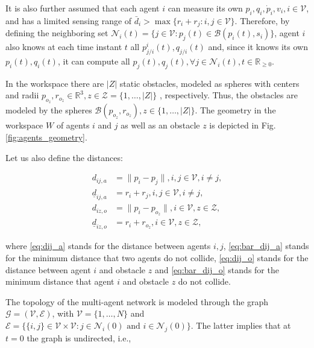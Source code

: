 It is also further assumed that each agent $i$ can measure its
own $p_i,q_i, \dot{p}_i, v_i, i\in\mathcal{V}$, and has a limited sensing range
of $\bar{d}_i > \max\{r_i+r_j: i,j \in \mathcal{V}\}$. Therefore, by defining
the neighboring set $\mathcal{N}_i(t) = \{j\in\mathcal{V} : p_j(t)\in\mathcal{B}(p_i(t), s_i)\}$,
agent $i$ also knows at each time instant $t$ all $p^i_{j/i}(t), q_{j/i}(t)$
and, since it knows its own $p_i(t),q_i(t)$, it can compute all
$p_{j}(t), q_{j}(t), \forall j\in \mathcal{N}_i(t),t\in\mathbb{R}_{\geq 0}$.

In the workspace there are $|Z|$ static obstacles, modeled as spheres with
centers and radii $p_{o_z}, r_{o_z}\in \mathbb{R}^3, z \in \mathcal{Z} = \{1,\dots,|Z| \}$
, respectively. Thus, the obstacles are modeled by the spheres
$\mathcal{B}(p_{o_z}, r_{o_z}), z \in \{1,\dots,|Z|\}$. The geometry in the
workspace $W$ of agents $i$ and $j$ as well as an obstacle $z$ is depicted in
Fig. \ref{fig:agents_geometry}.

Let us also define the distances:

\begin{subequations}
	\begin{align}
	d_{ij,a} &= \| p_i - p_j \|, i,j \in \mathcal{V}, i \neq j, \label{eq:dij_a}\\
	\underline{d}_{ij, a} &= r_{i} + r_{j}, i,j \in \mathcal{V}, i \neq j, \label{eq:bar_dij_a} \\
	d_{iz,o} &= \| p_i - p_{o_z} \|, i \in \mathcal{V}, z \in \mathcal{Z}, \label{eq:dij_o} \\
	\underline{d}_{iz, o} &= r_{i} + r_{o_z}, i \in \mathcal{V}, z \in \mathcal{Z}, \label{eq:bar_dij_o}
	\end{align}
\end{subequations}

where \eqref{eq:dij_a} stands for the distance between agents $i,j$,
\eqref{eq:bar_dij_a} stands for the minimum distance that two agents do not
collide, \eqref{eq:dij_o} stands for the distance between agent $i$ and
obstacle $z$ and \eqref{eq:bar_dij_o} stands for the minimum distance that
agent $i$ and obstacle $z$ do not collide.

The topology of the multi-agent network is modeled through the graph
$\mathcal{G} = (\mathcal{V},\mathcal{E})$, with $\mathcal{V}=\{1,\dots,N\}$
and $\mathcal{E}=\{\{i,j\}\in\mathcal{V}\times\mathcal{V} : j\in\mathcal{N}_i(0) \text{ and } i\in\mathcal{N}_j(0)\}$.
The latter implies that at $t=0$ the graph is undirected, i.e.,


